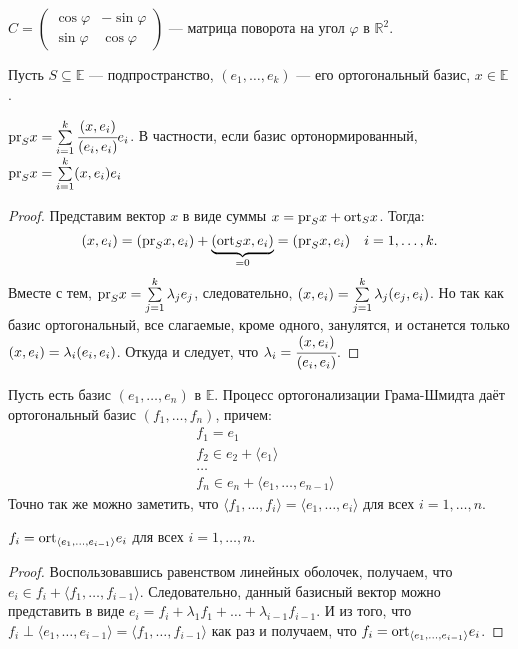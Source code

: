 \begin{Examples}
	$C = \begin{pmatrix}
	\cos \varphi& -\sin \varphi\\
	\sin \varphi& \cos \varphi
	\end{pmatrix}$ --- матрица поворота на угол $\varphi$ в $\mathbb{R}^2$.
\end{Examples}

Пусть $S \subseteq \mathbb{E}$ --- подпространство, $(e_1, \ldots, e_k)$ --- его ортогональный базис, $x \in \mathbb{E}$.
\begin{Suggestion}
	$\mathrm{pr}_S x = \sum\limits_{i = 1}^{k}\cfrac{(x,e_i)}{(e_i, e_i)}e_i$. В частности, если базис ортонормированный, \\$\mathrm{pr}_S x = \sum\limits_{i = 1}^{k}(x,e_i)e_i$
\end{Suggestion}
\begin{proof}
Представим вектор $x$ в виде суммы $x = \mathrm{pr}_Sx + \mathrm{ort}_Sx$. Тогда:
$$
(x, e_i) = (\mathrm{pr}_S x, e_i) + \underbrace{(\mathrm{ort}_S x, e_i)}_{=0} = (\mathrm{pr}_S x, e_i) \quad i = 1, \ldots, k.
$$
Вместе с тем, $\mathrm{pr}_S x = \sum\limits_{j = 1}^{k}\lambda_je_j$, следовательно, $(x, e_i) = \sum\limits_{j = 1}^k\lambda_j(e_j, e_i)$.
Но так как базис ортогональный, все слагаемые, кроме одного, занулятся, и останется только $(x, e_i) = \lambda_i(e_i, e_i)$. Откуда и следует, что $\lambda_i = \cfrac{(x, e_i)}{(e_i, e_i)}$.
\end{proof}

Пусть есть базис $(e_1, \ldots, e_n)$ в $\mathbb{E}$. Процесс ортогонализации Грама-Шмидта даёт ортогональный базис $(f_1, \ldots, f_n)$, причем:
\begin{align*}
	& f_1 = e_1\\
	& f_2 \in e_2 + \langle e_1 \rangle\\
	& \ldots\\
	& f_n  \in e_n + \langle e_1, \ldots, e_{n - 1} \rangle
\end{align*}
Точно так же можно заметить, что $\langle f_1, \ldots, f_i \rangle = \langle e_1, \ldots, e_i\rangle$ для всех $i= 1, \ldots, n$.
\begin{Suggestion}
	$f_i = \mathrm{ort}_{\langle e_1, \ldots, e_{i-1}\rangle} e_i$ для всех $i = 1, \ldots, n$.
\end{Suggestion}
\begin{proof}
Воспользовавшись равенством линейных оболочек, получаем, что \\$e_i \in f_i + \langle f_1, \ldots, f_{i-1}\rangle$. Следовательно, данный базисный вектор можно представить в виде $e_i = f_i + \lambda_1f_1 + \ldots + \lambda_{i -1} f_{i -1}$. И из того, что $f_i \perp \langle e_1, \ldots, e_{i -1} \rangle = \langle f_1, \ldots, f_{i - 1}\rangle$ как раз и получаем, что $f_i = \mathrm{ort}_{\langle e_1, \ldots, e_{i-1}\rangle} e_i$.
\end{proof}

